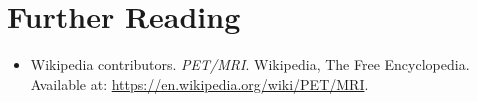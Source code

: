 \section{Further Reading}
\begin{itemize}
  \item Wikipedia contributors. \textit{PET/MRI}. Wikipedia, The Free Encyclopedia. Available at: \url{https://en.wikipedia.org/wiki/PET/MRI}.
\end{itemize}
